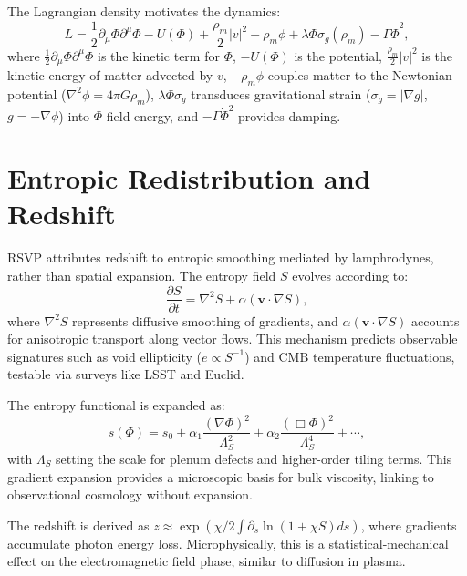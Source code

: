 \documentclass[12pt, a4paper, openany]{book}
\theoremstyle{definition}
\begin{document}
The Lagrangian density motivates the dynamics:
\begin{equation}
L = \frac{1}{2} \partial_\mu \Phi \partial^\mu \Phi - U(\Phi) + \frac{\rho_m}{2} |v|^2 - \rho_m \phi + \lambda \Phi \sigma_g (\rho_m) - \Gamma \dot{\Phi}^2,
\end{equation}
where $\frac{1}{2} \partial_\mu \Phi \partial^\mu \Phi$ is the kinetic term for $\Phi$, $-U(\Phi)$ is the potential, $\frac{\rho_m}{2} |v|^2$ is the kinetic energy of matter advected by $v$, $-\rho_m \phi$ couples matter to the Newtonian potential ($\nabla^2 \phi = 4\pi G \rho_m$), $\lambda \Phi \sigma_g$ transduces gravitational strain ($\sigma_g = | \nabla g |$, $g = - \nabla \phi$) into $\Phi$-field energy, and $-\Gamma \dot{\Phi}^2$ provides damping.

\section{Entropic Redistribution and Redshift}
RSVP attributes redshift to entropic smoothing mediated by lamphrodynes, rather than spatial expansion. The entropy field $S$ evolves according to:
\begin{equation}
\frac{\partial S}{\partial t} = \nabla^2 S + \alpha (\mathbf{v} \cdot \nabla S),
\end{equation}
where $\nabla^2 S$ represents diffusive smoothing of gradients, and $\alpha (\mathbf{v} \cdot \nabla S)$ accounts for anisotropic transport along vector flows. This mechanism predicts observable signatures such as void ellipticity ($e \propto S^{-1}$) and CMB temperature fluctuations, testable via surveys like LSST and Euclid.

The entropy functional is expanded as:
\begin{equation}
s(\Phi) = s_0 + \alpha_1 \frac{(\nabla \Phi)^2}{\Lambda_S^2} + \alpha_2 \frac{(\Box \Phi)^2}{\Lambda_S^4} + \cdots,
\end{equation}
with $\Lambda_S$ setting the scale for plenum defects and higher-order tiling terms. This gradient expansion provides a microscopic basis for bulk viscosity, linking to observational cosmology without expansion.

The redshift is derived as $z \approx \exp \left( \chi / 2 \int \partial_s \ln(1 + \chi S) ds \right)$, where gradients accumulate photon energy loss. Microphysically, this is a statistical-mechanical effect on the electromagnetic field phase, similar to diffusion in plasma.
\end{document}
